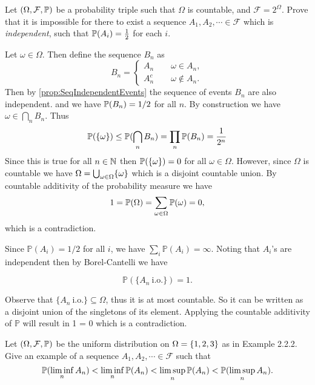 \begin{problem}
	Let $ (\Omega, \mathcal{F},\mathbb{P}) $ be a probability triple such that $ \Omega $ is countable, and $ \mathcal{F} = 2^\Omega $. Prove that it is impossible for there to exist a sequence $ A_1,A_2,\cdots \in \mathcal{F} $ which is \emph{independent}, such that $ \mathbb{P}(A_i)=\frac{1}{2} $ for each $ i $.
\end{problem}
\begin{solution}
	Let $ \omega \in \Omega $. Then define the sequence $ B_n $ as 
	\[ B_n = \begin{cases}
		A_n \qquad \omega \in A_n, \\
		A_n^c \qquad \omega \notin A_n.
	\end{cases} \]
	Then by \autoref{prop:SeqIndependentEvents} the sequence of events $ B_n $ are also independent. and we have $ \mathbb{P}(B_n)=1/2 $ for all $ n $. By construction we have $ \omega \in \bigcap_n B_n $. Thus 
	\[ \mathbb{P}(\{\omega\}) \leq \mathbb{P}(\bigcap_n B_n) = \prod_n \mathbb{P}(B_n) = \frac{1}{2^n} \]
	Since this is true for all $ n \in \mathbb{N} $ then $ \mathbb{P}(\{\omega\}) = 0 $ for all $ \omega \in \Omega $. However, since $ \Omega $ is countable we have $ \Omega = \bigcup_{\omega \in \Omega}\{\omega\} $ which is a disjoint countable union. By countable additivity of the probability measure we have
	\[ 1 = \mathbb{P}(\Omega) = \sum_{\omega\in\Omega}\mathbb{P}(\omega) = 0,  \]
	which is a contradiction.
\end{solution}
\begin{solution}
	Since $\mathbb{P}(A_i) = 1/2$ for all $i$, we have $\sum_i \mathbb{P}(A_i) = \infty$. Noting that $A_i$'s are independent then by Borel-Cantelli we have
	
	$$ \mathbb{P}(\{ A_n \ \text{i.o.} \}) = 1.$$
	
	Observe that $ \{ A_n \ \text{i.o.} \} \subseteq \Omega $, thus it is at most countable. So it can be written as a disjoint union of the singletons of its element. Applying the countable additivity of $\mathbb{P}$ will result in 1 = 0 which is a contradiction.
\end{solution}

\begin{problem}
	Let $ (\Omega,\mathcal{F},\mathbb{P}) $ be the uniform distribution on $ \Omega = \{1,2,3\} $ as in Example 2.2.2. Give an example of a sequence $ A_1,A_2,\cdots\in\mathcal{F} $ such that 
	\[ \mathbb{P}(\liminf_n A_n) < \liminf_n \mathbb{P}(A_n) < \limsup_n \mathbb{P}(A_n) < \mathbb{P}(\limsup_n A_n). \]
\end{problem}


